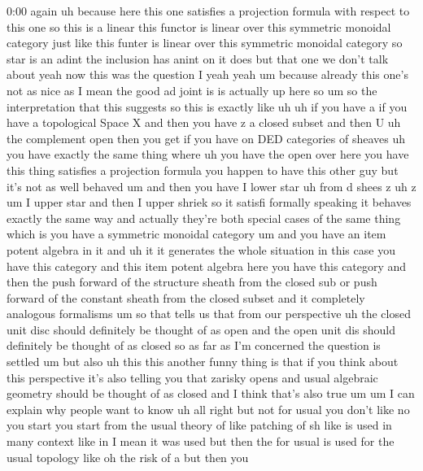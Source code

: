 \begin{unfinished}{0:00}
again  uh  because  here  this  one  satisfies
a  projection  formula  with  respect  to
this  one  so  this  is  a  linear  this
functor  is  linear  over  this  symmetric
monoidal  category  just  like  this  funter
is  linear  over  this  symmetric  monoidal
category  so  star  is  an  adint  the
inclusion  has  anint  on  it  does  but  that
one  we  don't  talk  about  yeah  now  this
was  the  question  I
yeah  yeah  um  because  already  this  one's
not  as  nice  as  I  mean  the  good  ad  joint
is  is  actually  up  here  so  um  so  the
interpretation  that  this  suggests  so
this  is  exactly  like
uh  uh  if  you  have  a  if  you  have  a
topological  Space
X  and  then  you  have  z  a  closed
subset  and  then  U  uh  the  complement  open
then  you  get  if  you  have  on  DED
categories  of
sheaves  uh  you  have  exactly  the  same
thing
where  uh  you  have  the  open  over  here  you
have  this  thing  satisfies  a  projection
formula  you  happen  to  have  this  other
guy  but  it's  not  as  well  behaved  um  and
then  you  have  I  lower  star  uh  from  d
shees
z  uh
z  um  I  upper  star  and  then  I  upper
shriek  so  it  satisfi  formally  speaking
it  behaves  exactly  the  same  way  and
actually  they're  both  special  cases  of
the  same  thing  which  is  you  have  a
symmetric  monoidal  category  um  and  you
have  an  item  potent  algebra  in  it  and  uh
it  it  generates  the  whole  situation  in
this  case  you  have  this  category  and
this  item  potent  algebra  here  you  have
this  category  and  then  the  push  forward
of  the  structure  sheath  from  the  closed
sub  or  push  forward  of  the  constant
sheath  from  the  closed  subset  and
it  completely  analogous
formalisms  um
so  that  tells  us  that  from  our
perspective  uh  the  closed  unit  disc
should  definitely  be  thought  of  as  open
and  the  open  unit  dis  should  definitely
be  thought  of  as  closed  so  as  far  as  I'm
concerned  the  question  is
settled  um  but  also  uh  this  this  another
funny  thing  is  that  if  you  think  about
this  perspective  it's  also  telling  you
that  zarisky  opens  and  usual  algebraic
geometry  should  be  thought  of  as  closed
and  I  think  that's  also  true
um  um  I  can  explain  why  people  want  to
know  uh  all
right  but  not  for
usual  you  don't  like  no  you  start  you
start  from  the  usual  theory  of  like
patching  of  sh  like  is  used  in  many
context
like  in  I  mean  it  was  used  but  then  the
for  usual  is  used  for  the  usual  topology
like  oh  the  risk  of  a  but  then  you

\end{unfinished}
